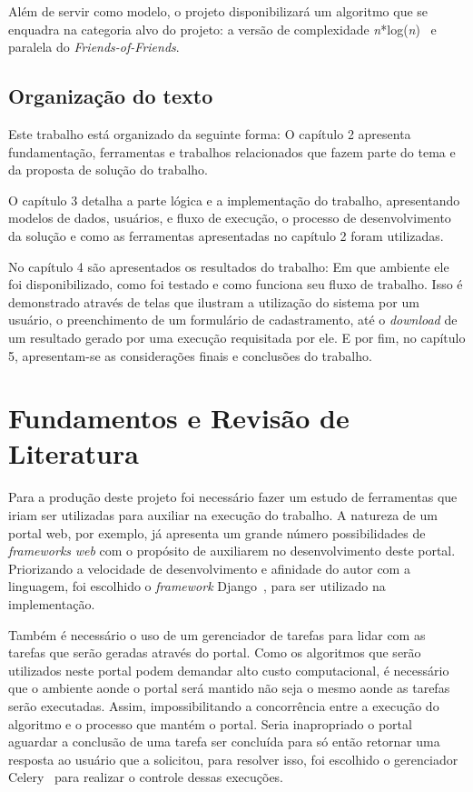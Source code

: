\documentclass[tg]{mdtufsm}
\begin{document}
Além de servir como modelo, o projeto disponibilizará um algoritmo que se enquadra na categoria alvo do projeto: a versão de complexidade \emph{n}*log(\emph{n})~ e paralela do \emph{Friends-of-Friends}.


\section{Organização do texto}
Este trabalho está organizado da seguinte forma: O capítulo 2 apresenta fundamentação, ferramentas e trabalhos relacionados que fazem parte do tema e da proposta de solução do trabalho.

O capítulo 3 detalha a parte lógica e a implementação do trabalho, apresentando modelos de dados, usuários, e fluxo de execução, o processo de desenvolvimento da solução e como as ferramentas apresentadas no capítulo 2 foram utilizadas.

No capítulo 4 são apresentados os resultados do trabalho: Em que ambiente ele foi disponibilizado, como foi testado e como funciona seu fluxo de trabalho. Isso é demonstrado através de telas que ilustram a utilização do sistema por um usuário, o preenchimento de um formulário de cadastramento, até o \emph{download} de um resultado gerado por uma execução requisitada por ele. E por fim, no capítulo 5, apresentam-se as considerações finais e conclusões do trabalho.

\chapter{Fundamentos e Revisão de Literatura}
Para a produção deste projeto foi necessário fazer um estudo de ferramentas que iriam ser utilizadas para auxiliar na execução do trabalho. A natureza de um portal web, por exemplo, já apresenta um grande número possibilidades de \emph{frameworks} \emph{web} com o propósito de auxiliarem no desenvolvimento deste portal. Priorizando a velocidade de desenvolvimento e afinidade do autor com a linguagem, foi escolhido o \emph{framework} Django~\cite{Django}, para ser utilizado na implementação.

Também é necessário o uso de um gerenciador de tarefas para lidar com as tarefas que serão geradas através do portal. Como os algoritmos que serão utilizados neste portal podem demandar  alto custo computacional, é necessário que o ambiente aonde o portal será mantido não seja o mesmo aonde as tarefas serão executadas. Assim, impossibilitando a concorrência entre a execução do algoritmo e o processo que mantém o portal. Seria inapropriado o portal aguardar a conclusão de uma tarefa ser concluída para só então retornar uma resposta ao usuário que a solicitou, para resolver isso, foi escolhido o gerenciador Celery~\cite{Celery} para realizar o controle dessas execuções.
\end{document}

